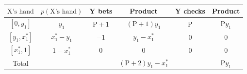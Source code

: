 \documentclass[border=3pt]{standalone}
\begin{document}
{\Large
\renewcommand{\arraystretch}{1.3}
\begin{tabular}{|c|c|c|c|c|c|}
\hline
    $\mathrm{X}\text{'s hand}$ &
    $p(\mathrm{X}\text{'s hand})$ &
    Y bets &
    Product &
    Y checks &
    Product \\
\hline
    $[0, y_1]$ &
    $y_1$ &
    $\mathrm{P}+1$ &
    $(\mathrm{P}+1)y_1$ &
    $\mathrm{P}$ &
    $\mathrm{P}y_1$ \\
\hline
    $[y_1, x_1^*]$ &
    $x_1^* - y_1$ &
    $-1$ &
    $y_1 - x_1^*$ &
    $0$ &
    $0$ \\
\hline
    $[x_1^*, 1]$ &
    $1 - x_1^*$ &
    $0$ &
    $0$ &
    $0$ &
    $0$ \\
\hline
    Total & & & $(\mathrm{P}+2)y_1 - x_1^*$ & & $\mathrm{P}y_1$ \\
\hline
\end{tabular}
}
\end{document}

